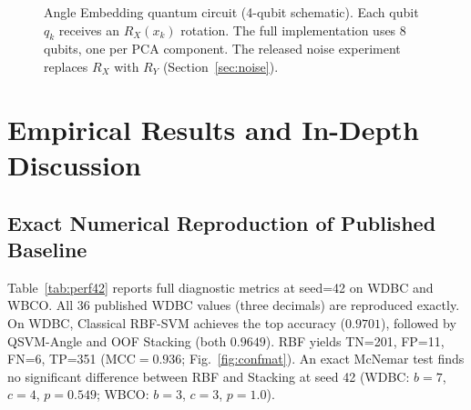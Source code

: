 \documentclass[journal,twocolumn]{IEEEtran}
\begin{document}
\begin{figure}[!t]
\centering
{}
\caption{Angle Embedding quantum circuit (4-qubit schematic). Each qubit $q_k$ receives an $R_X(x_k)$ rotation. The full implementation uses 8 qubits, one per PCA component. The released noise experiment replaces $R_X$ with $R_Y$ (Section~\ref{sec:noise}).}
\label{fig:circuit}
\end{figure}

\section{Empirical Results and In-Depth Discussion}
\label{sec:results}

\subsection{Exact Numerical Reproduction of Published Baseline}
\label{sec:repro}

Table~\ref{tab:perf42} reports full diagnostic metrics at seed=42 on WDBC and WBCO. All 36 published WDBC values (three decimals) are reproduced exactly. On WDBC, Classical RBF-SVM achieves the top accuracy ($0.9701$), followed by QSVM-Angle and OOF Stacking (both $0.9649$). RBF yields TN=201, FP=11, FN=6, TP=351 ($\text{MCC} = 0.936$; Fig.~\ref{fig:confmat}). An exact McNemar test finds no significant difference between RBF and Stacking at seed 42 (WDBC: $b=7$, $c=4$, $p=0.549$; WBCO: $b=3$, $c=3$, $p=1.0$).
\end{document}

